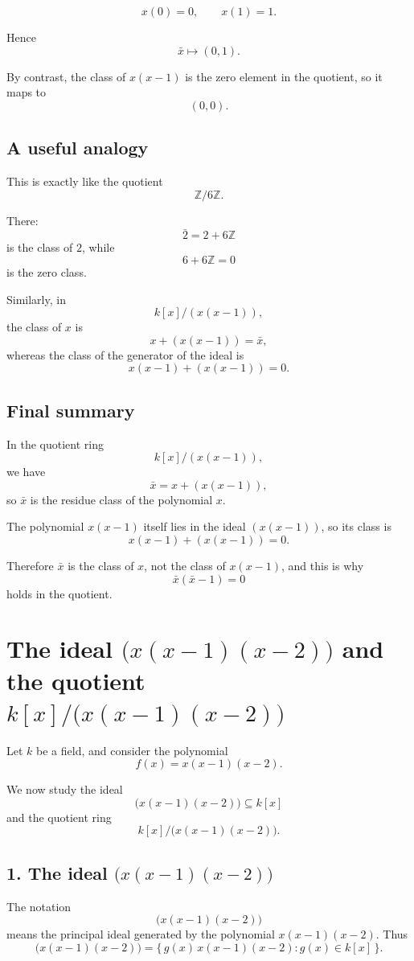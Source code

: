 \documentclass[12pt,a4paper]{article}
\theoremstyle{notespace}
\begin{document}
\[
x(0)=0,
\qquad
x(1)=1.
\]

Hence
\[
\bar x \longmapsto (0,1).
\]

By contrast, the class of \(x(x-1)\) is the zero element in the quotient, so it maps to
\[
(0,0).
\]

\subsection{A useful analogy}

This is exactly like the quotient
\[
\mathbb Z/6\mathbb Z.
\]

There:
\[
\bar 2 = 2+6\mathbb Z
\]
is the class of \(2\), while
\[
6+6\mathbb Z=0
\]
is the zero class.

Similarly, in
\[
k[x]/(x(x-1)),
\]
the class of \(x\) is
\[
x+(x(x-1))=\bar x,
\]
whereas the class of the generator of the ideal is
\[
x(x-1)+(x(x-1))=0.
\]

\subsection{Final summary}

In the quotient ring
\[
k[x]/(x(x-1)),
\]
we have
\[
\bar x = x+(x(x-1)),
\]
so \(\bar x\) is the residue class of the polynomial \(x\).

The polynomial \(x(x-1)\) itself lies in the ideal \((x(x-1))\), so its class is
\[
x(x-1)+(x(x-1))=0.
\]

Therefore \(\bar x\) is the class of \(x\), not the class of \(x(x-1)\), and this is why
\[
\bar x(\bar x-1)=0
\]
holds in the quotient.

\section{The ideal \(\bigl(x(x-1)(x-2)\bigr)\) and the quotient \(k[x]/\bigl(x(x-1)(x-2)\bigr)\)}

Let \(k\) be a field, and consider the polynomial
\[
f(x)=x(x-1)(x-2).
\]

We now study the ideal
\[
\bigl(x(x-1)(x-2)\bigr)\subseteq k[x]
\]
and the quotient ring
\[
k[x]/\bigl(x(x-1)(x-2)\bigr).
\]

\subsection{1. The ideal \(\bigl(x(x-1)(x-2)\bigr)\)}

The notation
\[
\bigl(x(x-1)(x-2)\bigr)
\]
means the principal ideal generated by the polynomial \(x(x-1)(x-2)\). Thus
\[
\bigl(x(x-1)(x-2)\bigr)
=
\{\,g(x)\,x(x-1)(x-2):g(x)\in k[x]\,\}.
\]
\end{document}
